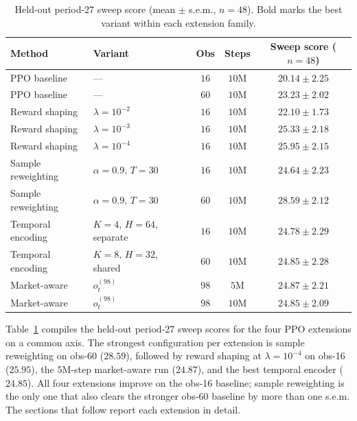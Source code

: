 \documentclass{article}
\begin{document}
\begin{table}[h]
  \centering
  \small
  \caption{Held-out period-27 sweep score (mean $\pm$ s.e.m., $n{=}48$).
  Bold marks the best variant within each extension family.}
  \label{tab:ppo-extensions-summary}
  \begin{tabular}{@{}llccc@{}}
    \toprule
    Method & Variant & Obs & Steps & Sweep score ($n{=}48$) \\
    \midrule
    PPO baseline       & ---                                  & $16$ & $10$M & $20.14 \pm 2.25$ \\
    PPO baseline       & ---                                  & $60$ & $10$M & $23.23 \pm 2.02$ \\
    \midrule
    Reward shaping     & $\lambda = 10^{-2}$                  & $16$ & $10$M & $22.10 \pm 1.73$ \\
    Reward shaping     & $\lambda = 10^{-3}$                  & $16$ & $10$M & $25.33 \pm 2.18$ \\
    Reward shaping     & $\lambda = 10^{-4}$                  & $16$ & $10$M & $\mathbf{25.95 \pm 2.15}$ \\
    \midrule
    Sample reweighting & $\alpha{=}0.9,\,T{=}30$              & $16$ & $10$M & $24.64 \pm 2.23$ \\
    Sample reweighting & $\alpha{=}0.9,\,T{=}30$              & $60$ & $10$M & $\mathbf{28.59 \pm 2.12}$ \\
    \midrule
    Temporal encoding  & $K{=}4,\,H{=}64$, separate           & $16$ & $10$M & $24.78 \pm 2.29$ \\
    Temporal encoding  & $K{=}8,\,H{=}32$, shared             & $60$ & $10$M & $\mathbf{24.85 \pm 2.28}$ \\
    \midrule
    Market-aware       & $o_t^{(98)}$                         & $98$ & $5$M  & $\mathbf{24.87 \pm 2.21}$ \\
    Market-aware       & $o_t^{(98)}$                         & $98$ & $10$M & $24.85 \pm 2.09$ \\
    \bottomrule
  \end{tabular}
\end{table}

Table~\ref{tab:ppo-extensions-summary} compiles the held-out period-27 sweep
scores for the four PPO extensions on a common axis. The strongest
configuration per extension is sample reweighting on obs-60 ($28.59$),
followed by reward shaping at $\lambda{=}10^{-4}$ on obs-16 ($25.95$), the
$5$M-step market-aware run ($24.87$), and the best temporal encoder
($24.85$). All four extensions improve on the obs-16 baseline; sample
reweighting is the only one that also clears the stronger obs-60 baseline by
more than one s.e.m. The sections that follow report each extension in
detail.
\end{document}
